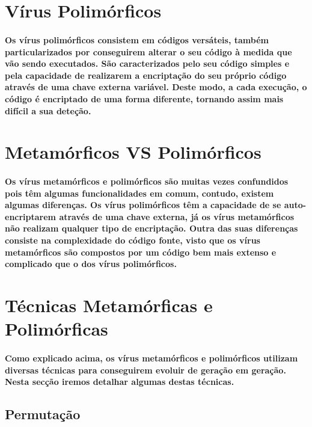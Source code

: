 \documentclass[runningheads]{llncs}
\begin{document}
\section{Vírus Polimórficos}

\paragraph{Os vírus polimórficos consistem em códigos versáteis, também particularizados por conseguirem alterar o seu código à medida que vão sendo executados.
São caracterizados pelo seu código simples e pela capacidade de realizarem a encriptação do seu próprio código através de uma chave externa variável. Deste modo, a cada execução, o código é encriptado de uma forma diferente, tornando assim mais difícil a sua deteção.}\cite{2}\cite{3}\cite{1}

\newpage

\section{Metamórficos VS Polimórficos}

\paragraph{Os vírus metamórficos e polimórficos são muitas vezes confundidos pois têm algumas funcionalidades em comum, contudo, existem algumas diferenças. 
Os vírus polimórficos têm a capacidade de se auto-encriptarem através de uma chave externa, já os vírus metamórficos não realizam qualquer tipo de encriptação. 
Outra das suas diferenças consiste na complexidade do código fonte, visto que os vírus metamórficos são compostos por um código bem mais extenso e complicado que o dos vírus polimórficos.}\cite{1}

\section{Técnicas Metamórficas e Polimórficas}

\paragraph{Como explicado acima, os vírus metamórficos e polimórficos utilizam  diversas técnicas para conseguirem evoluir de geração em geração. Nesta secção iremos detalhar algumas destas técnicas.}\cite{1}

\subsection{Permutação}
\end{document}
